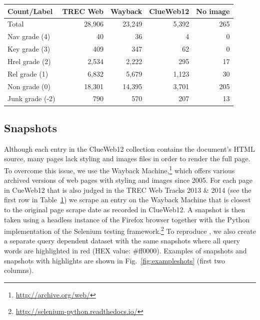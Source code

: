\begin{table}[h]
  \label{tab:countsources}
  \begin{tabular}{ l  @{}r  r  r  r }
  \toprule
    Count/Label & TREC Web & Wayback & ClueWeb12 & \mbox{}\hspace*{-.15cm}No image\\
    \midrule
    Total & 28,906 & 23,249 & 5,392 & 265 \\
    Nav grade (4) & 40 & 36 & 4 & 0\\
    Key grade (3) & 409 & 347 & 62 & 0\\
    Hrel grade (2) & 2,534 & 2,222 & 295 & 17 \\
    Rel grade (1) & 6,832 & 5,679 & 1,123 & 30\\
    Non grade (0) & 18,301 & 14,395 & 3,701 & 205 \\
    Junk grade (-2) & 790 & 570 & 207 & 13\\
    \bottomrule
  \end{tabular} 
\end{table}


\subsection{Snapshots} \label{sec:screenshotsec}
Although each entry in the ClueWeb12 collection contains the document's HTML source, many pages lack styling and images files in order to render the full page.
To overcome this issue, we use the Wayback Machine,\footnote{\url{http://archive.org/web/}} which offers various archived versions of web pages with styling and images since 2005.
For each page in CueWeb12 that is also judged in the TREC Web Tracks 2013 \& 2014 (see the first row in Table~\ref{tab:countsources})
we scrape an entry on the Wayback Machine that is closest to the original page scrape date as recorded in ClueWeb12.
A snapshot is then taken using a headless instance of the Firefox browser together with the Python implementation of the Selenium testing framework.\footnote{\url{http://selenium-python.readthedocs.io/}}
To reproduce \cite{fan2017learning}, we also create a separate query dependent dataset with the same snapshots where all query words are highlighted in red (HEX value: \#ff0000).
Examples of snapshots and snapshots with highlights are shown in Fig.~\ref{fig:exampleshots} (first two columns).

